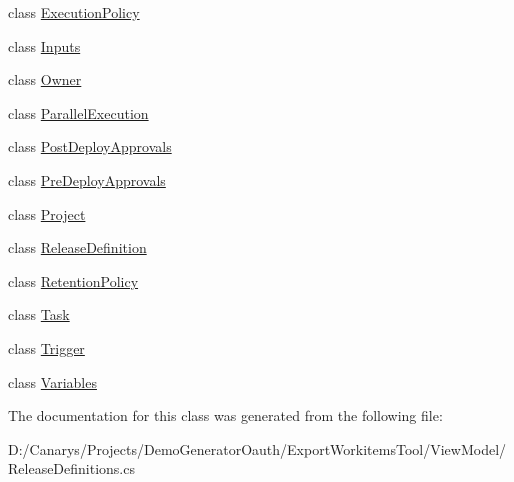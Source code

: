 \begin{DoxyCompactItemize}
\item 
class \mbox{\hyperlink{class_templates_generator_tool_1_1_view_model_1_1_release_definitions_1_1_execution_policy}{Execution\+Policy}}
\item 
class \mbox{\hyperlink{class_templates_generator_tool_1_1_view_model_1_1_release_definitions_1_1_inputs}{Inputs}}
\item 
class \mbox{\hyperlink{class_templates_generator_tool_1_1_view_model_1_1_release_definitions_1_1_owner}{Owner}}
\item 
class \mbox{\hyperlink{class_templates_generator_tool_1_1_view_model_1_1_release_definitions_1_1_parallel_execution}{Parallel\+Execution}}
\item 
class \mbox{\hyperlink{class_templates_generator_tool_1_1_view_model_1_1_release_definitions_1_1_post_deploy_approvals}{Post\+Deploy\+Approvals}}
\item 
class \mbox{\hyperlink{class_templates_generator_tool_1_1_view_model_1_1_release_definitions_1_1_pre_deploy_approvals}{Pre\+Deploy\+Approvals}}
\item 
class \mbox{\hyperlink{class_templates_generator_tool_1_1_view_model_1_1_release_definitions_1_1_project}{Project}}
\item 
class \mbox{\hyperlink{class_templates_generator_tool_1_1_view_model_1_1_release_definitions_1_1_release_definition}{Release\+Definition}}
\item 
class \mbox{\hyperlink{class_templates_generator_tool_1_1_view_model_1_1_release_definitions_1_1_retention_policy}{Retention\+Policy}}
\item 
class \mbox{\hyperlink{class_templates_generator_tool_1_1_view_model_1_1_release_definitions_1_1_task}{Task}}
\item 
class \mbox{\hyperlink{class_templates_generator_tool_1_1_view_model_1_1_release_definitions_1_1_trigger}{Trigger}}
\item 
class \mbox{\hyperlink{class_templates_generator_tool_1_1_view_model_1_1_release_definitions_1_1_variables}{Variables}}
\end{DoxyCompactItemize}


The documentation for this class was generated from the following file\+:\begin{DoxyCompactItemize}
\item 
D\+:/\+Canarys/\+Projects/\+Demo\+Generator\+Oauth/\+Export\+Workitems\+Tool/\+View\+Model/Release\+Definitions.\+cs\end{DoxyCompactItemize}
